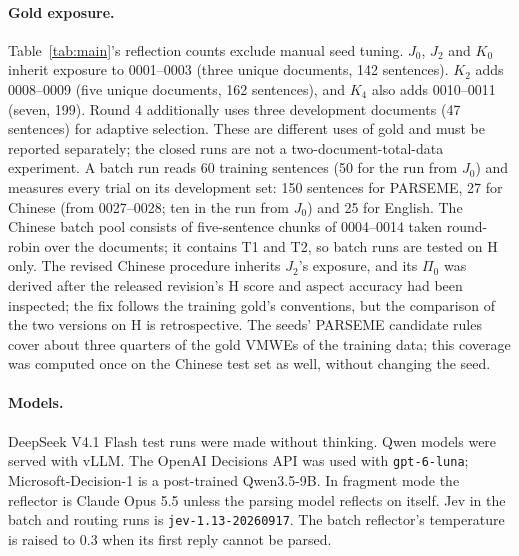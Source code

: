 \paragraph{Gold exposure.} Table~\ref{tab:main}'s reflection counts exclude manual seed tuning. $J_0$, $J_2$ and $K_0$ inherit exposure to 0001--0003 (three unique documents, 142 sentences). $K_2$ adds 0008--0009 (five unique documents, 162 sentences), and $K_4$ also adds 0010--0011 (seven, 199). Round 4 additionally uses three development documents (47 sentences) for adaptive selection. These are different uses of gold and must be reported separately; the closed runs are not a two-document-total-data experiment. A batch run reads 60 training sentences (50 for the run from $J_0$) and measures every trial on its development set: 150 sentences for PARSEME, 27 for Chinese \umr (from 0027--0028; ten in the run from $J_0$) and 25 for English. The Chinese batch pool consists of five-sentence chunks of 0004--0014 taken round-robin over the documents; it contains T1 and T2, so batch runs are tested on H only. The revised Chinese procedure inherits $J_2$'s exposure, and its $\Pi_0$ was derived after the released revision's H score and aspect accuracy had been inspected; the fix follows the training gold's conventions, but the comparison of the two versions on H is retrospective. The seeds' PARSEME candidate rules cover about three quarters of the gold VMWEs of the training data; this coverage was computed once on the Chinese test set as well, without changing the seed.

\paragraph{Models.} DeepSeek V4.1 Flash test runs were made without thinking. Qwen models were served with vLLM. The OpenAI Decisions API was used with \texttt{gpt-6-luna}; Microsoft-Decision-1 is a post-trained Qwen3.5-9B. In fragment mode the reflector is Claude Opus 5.5 unless the parsing model reflects on itself. Jev in the batch and routing runs is \texttt{jev-1.13-20260917}. The batch reflector's temperature is raised to 0.3 when its first reply cannot be parsed.


